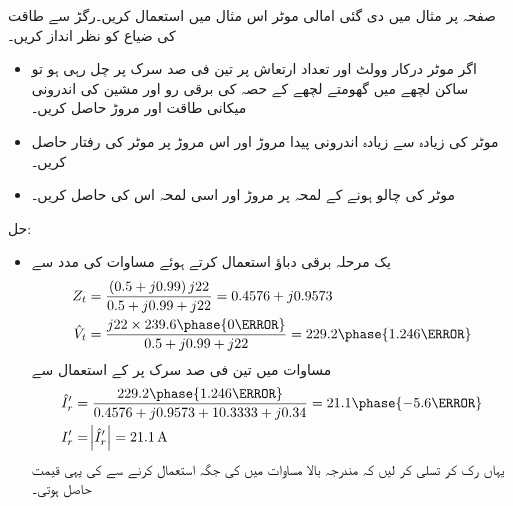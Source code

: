 صفحہ  پر مثال   میں دی گئی امالی موٹر اس مثال میں استعمال کریں۔رگڑ سے طاقت کی ضیاع کو نظر انداز کریں۔
\begin{itemize}
\item
اگر موٹر درکار وولٹ اور تعداد ارتعاش پر تین فی صد سرک پر چل رہی ہو تو  ساکن لچھے میں گھومتے لچھے کے حصہ کی برقی رو  اور مشین کی اندرونی میکانی طاقت اور مروڑ حاصل کریں۔
\item
موٹر کی زیادہ سے زیادہ اندرونی پیدا مروڑ اور اس مروڑ پر موٹر کی رفتار حاصل کریں۔
\item
موٹر کی چالو ہونے کے لمحہ پر مروڑ اور اسی لمحہ اس کی   حاصل کریں۔ 
\end{itemize}

حل:
\begin{itemize}
\item
 یک مرحلہ  برقی دباؤ   استعمال کرتے ہوئے مساوات   کی مدد سے
\begin{align*}
Z_t&=\frac{\left(0.5+j 0.99 \right) j 22}{0.5+j 0.99+j 22}=0.4576+j 0.9573\\
\hat{V}_t&=\frac{j 22 \times 239.6 \phase{0\degree}}{0.5+j 0.99+j 22}=229.2\phase{1.246\degree}
\end{align*}
مساوات   میں  تین فی صد سرک پر  کے استعمال سے
\begin{align*}
\hat{I}_r'&=\frac{229.2 \phase{1.246\degree}}{0.4576+j 0.9573+10.3333+j 0.34}=21.1\phase{-5.6\degree}\\
I_r'&=\abs{\hat{I}_r'}=\SI{21.1}{\ampere}
\end{align*}
یہاں رک کر تسلی کر لیں کہ مندرجہ بالا مساوات میں  کی جگہ  استعمال کرنے سے  کی یہی قیمت حاصل ہوتی۔


\end{itemize}
